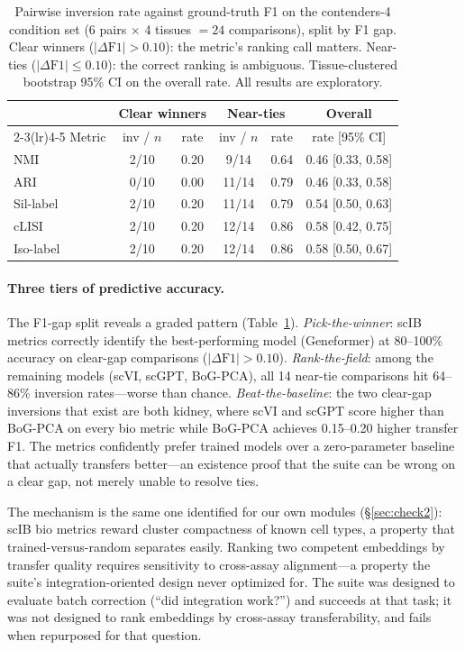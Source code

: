 \documentclass[9pt,lineno]{elife}
\begin{document}
\begin{table}[t]
\centering
\caption{Pairwise inversion rate against ground-truth F1 on the contenders-4 condition set (6 pairs $\times$ 4 tissues $= 24$ comparisons), split by F1 gap. Clear winners ($|\Delta\text{F1}| > 0.10$): the metric's ranking call matters. Near-ties ($|\Delta\text{F1}| \leq 0.10$): the correct ranking is ambiguous. Tissue-clustered bootstrap 95\% CI on the overall rate. All results are exploratory.}
\label{tab:scib_inversions}
\small
\begin{tabular}{@{}lccccc@{}}
\toprule
 & \multicolumn{2}{c}{Clear winners} & \multicolumn{2}{c}{Near-ties} & Overall \\
\cmidrule(lr){2-3}\cmidrule(lr){4-5}
Metric & inv / $n$ & rate & inv / $n$ & rate & rate [95\% CI] \\
\midrule
NMI       & 2/10 & 0.20 & 9/14  & 0.64 & 0.46 [0.33, 0.58] \\
ARI       & 0/10 & 0.00 & 11/14 & 0.79 & 0.46 [0.33, 0.58] \\
Sil-label & 2/10 & 0.20 & 11/14 & 0.79 & 0.54 [0.50, 0.63] \\
cLISI     & 2/10 & 0.20 & 12/14 & 0.86 & 0.58 [0.42, 0.75] \\
Iso-label & 2/10 & 0.20 & 12/14 & 0.86 & 0.58 [0.50, 0.67] \\
\bottomrule
\end{tabular}
\end{table}

\paragraph{Three tiers of predictive accuracy.} The F1-gap split reveals a graded pattern (Table~\ref{tab:scib_inversions}). \emph{Pick-the-winner}: scIB metrics correctly identify the best-performing model (Geneformer) at 80--100\% accuracy on clear-gap comparisons ($|\Delta\text{F1}| > 0.10$). \emph{Rank-the-field}: among the remaining models (scVI, scGPT, BoG-PCA), all 14 near-tie comparisons hit 64--86\% inversion rates---worse than chance. \emph{Beat-the-baseline}: the two clear-gap inversions that exist are both kidney, where scVI and scGPT score higher than BoG-PCA on every bio metric while BoG-PCA achieves 0.15--0.20 higher transfer F1. The metrics confidently prefer trained models over a zero-parameter baseline that actually transfers better---an existence proof that the suite can be wrong on a clear gap, not merely unable to resolve ties.

The mechanism is the same one identified for our own modules (\S\ref{sec:check2}): scIB bio metrics reward cluster compactness of known cell types, a property that trained-versus-random separates easily. Ranking two competent embeddings by transfer quality requires sensitivity to cross-assay alignment---a property the suite's integration-oriented design never optimized for. The suite was designed to evaluate batch correction (``did integration work?'') and succeeds at that task; it was not designed to rank embeddings by cross-assay transferability, and fails when repurposed for that question.
\end{document}
